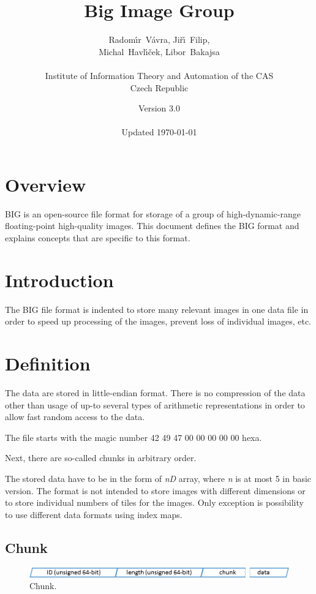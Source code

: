 \documentclass{article}
\title{Big Image Group}
\date{Version 3.0\\~\\Updated \today}
\author{Radom\'\i r~V\'avra, Ji\v r\'\i~Filip,\\Michal~Havl\'\i\v cek, Libor~Bakajsa\\\\Institute of Information Theory and Automation of the CAS\\Czech Republic}
\begin{document}
\maketitle

\section{Overview}
BIG is an open-source file format for storage of a group of high-dynamic-range floating-point high-quality images. This document defines the BIG format and explains concepts that are specific to this format.

\newpage

\tableofcontents

\newpage

\section{Introduction}

The BIG file format is indented to store many relevant images in one data file in order to speed up processing of the images, prevent loss of individual images, etc.

\section{Definition}

The data are stored in little-endian format. There is no compression of the data other than usage of up-to several types of arithmetic representations in order to allow fast random access to the data.

The file starts with the magic number 42 49 47 00 00 00 00 00 hexa.

Next, there are so-called chunks in arbitrary order.

The stored data have to be in the form of \textit{nD} array, where \textit{n} is at most 5 in basic version. The format is not intended to store images with different dimensions or to store individual numbers of tiles for the images. Only exception is possibility to use different data formats using index maps.

\subsection{Chunk}

\begin{figure}[!ht]
\begin{center}
  \includegraphics[width=1.0\columnwidth]{chunk}
\end{center}
\caption{\label{fig:chunk}Chunk.}
\end{figure}
\end{document}
